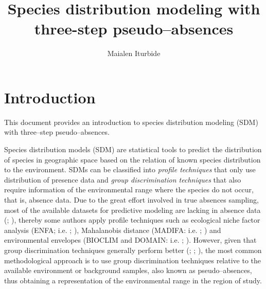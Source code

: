 \documentclass[10pt,a4paper]{report}
\begin{document}













\title{Species distribution modeling with three-step pseudo--absences}
\author{Maialen Iturbide}
\maketitle


\chapter{Introduction}

This document provides an introduction to species distribution modeling (SDM) with three--step pseudo--absences. 

Species distribution models (SDM) are statistical tools to predict the distribution of species in geographic space based on the relation of known species distribution to the environment. SDMs can be classified into \textit{profile techniques} that only use distribution of presence data and \textit{group discrimination techniques} that also require information of the environmental range where the species do not occur, that is, absence data. Due to the great effort involved in true absences sampling, most of the available datasets for predictive modeling are lacking in absence data (\citet{zaniewski_predicting_2002}; \citet{lobo_uncertain_2010}), thereby some authors apply profile techniques such as ecological niche factor analysis (ENFA; i.e. \citet{cianfrani_habitat_2010}; \citet{mckinney_feeding_2012}), Mahalanobis distance (MADIFA: i.e. \citet{kuo_unexpected_2010}; \citet{martin_brown_2012}) and environmental envelopes (BIOCLIM and DOMAIN: i.e. \citet{giovanelli_modeling_2010}; \citet{monk_habitat_2010}). However, given that group discrimination techniques generally perform better (\citet{elith_novel_2006}; \citet{engler_improved_2004}; \citet{chefaoui_assessing_2008}), the most common  methodological approach is to use group discrimination techniques relative to the available environment or background samples, also known as pseudo--absences, thus obtaining a representation of the environmental range in the region of study. 
\end{document}
